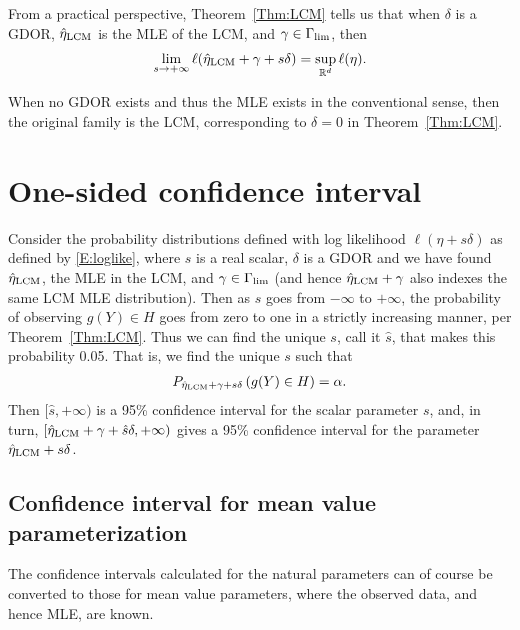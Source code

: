 From a practical perspective, Theorem~\ref{Thm:LCM} tells us that when 
$\delta$ is a GDOR, $\hat{\eta}_{\textrm{LCM}}$ is the MLE of the LCM, and $\gamma \in \Gamma_{\textrm{lim}}$, then
\begin{align*}
	\lim_{s \to +\infty} \ell(\hat{\eta}_{\textrm{LCM}} + \gamma + s\delta) = \sup_{{\mathbb R}^d} \ell(\eta).
\end{align*}

When no GDOR exists and thus the MLE exists in the conventional sense, then the 
original family is the LCM, corresponding to $\delta=0$ in Theorem~\ref{Thm:LCM}.

%


\section{One-sided confidence interval}

Consider the probability distributions defined with log likelihood $\ell( \eta + s 
\delta)$ as defined 
by \eqref{E:loglike}, where $s$ is a real scalar, $\delta$ is a GDOR and 
we have found $\hat{\eta}_{\textrm{LCM}}$, the MLE in the LCM, and $\gamma \in \Gamma_{\textrm{lim}}$
(and hence $\hat{\eta}_{\textrm{LCM}} + \gamma$ also indexes the same LCM MLE distribution).  Then 
as $s$ goes from $-\infty$ to $+\infty$, the probability of observing $g(Y) \in H$ 
goes from zero to one in a strictly increasing manner, per Theorem~\ref{Thm:LCM}.  Thus we can find the unique $s$, call it $\hat{s}$, that makes 
this probability 0.05.  That is, we find the unique $s$ such that
\begin{align*}
	P_{\hat{\eta}_{\textrm{LCM}} + \gamma + s\delta}\left (g(Y) \in H \right ) = \alpha.
\end{align*}
Then $[\hat{s}, +\infty)$ is a 95\% confidence interval for 
the scalar parameter 
$s$, and, in turn, $[\hat{\eta}_{\textrm{LCM}} + \gamma + \hat{s}\delta, +\infty)$ gives 
a 95\% confidence interval for the parameter $\hat{\eta}_{\textrm{LCM}} + s \delta$.

\subsection{Confidence interval for mean value parameterization}
The confidence intervals calculated for the natural parameters can of 
course be converted to those for mean value parameters, where the observed
data, and hence MLE, are known.  

